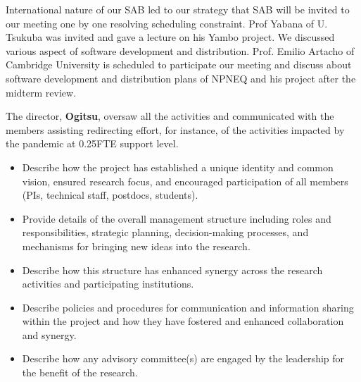 International nature of our SAB led to our strategy that SAB will be invited to our meeting one by one resolving scheduling constraint. Prof Yabana of U. Tsukuba was invited and gave a lecture on his Yambo project. We discussed various aspect of software development and distribution. Prof. Emilio Artacho of Cambridge University is scheduled to participate our meeting and discuss about software development and distribution plans of NPNEQ and his project after the midterm review.



The director, {\bf Ogitsu}, oversaw all the activities and communicated with the members assisting redirecting effort, for instance, of the activities impacted by the pandemic at 0.25FTE support level.  

{\small\color{red}
\begin{itemize}
    \item Describe how the project has established a unique identity and common vision, ensured research focus, and encouraged participation of all members (PIs, technical staff, postdocs, students).
    \item Provide details of the overall management structure including roles and responsibilities, strategic planning, decision-making processes, and mechanisms for bringing new ideas into the research.
    \item Describe how this structure has enhanced synergy across the research activities and participating institutions.
    \item Describe policies and procedures for communication and information sharing within the project and how they have fostered and enhanced collaboration and synergy.
    \item Describe how any advisory committee(s) are engaged by the leadership for the benefit of the research.
    
\end{itemize}
}



\clearpage
